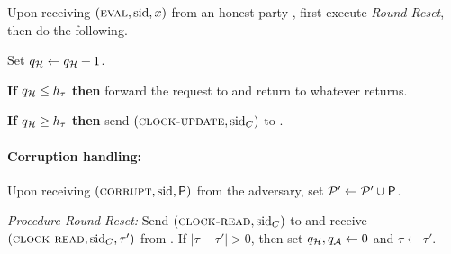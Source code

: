 \begin{cccFunctionality}
\begin{cccItemize}[nosep]
        \item Upon receiving $(\textsc{eval}, \mathrm{sid}, x)$ from an honest party \party, first execute \textit{Round Reset}, then do the following.
        \begin{cccEnum}[nosep]
            \item Set $q_\mathcal{H} \gets q_\mathcal{H} + 1$.
            \item \textbf{If} $q_\mathcal{H} \le h_\tau$ \textbf{then} forward the request to \funcRO and return to \party whatever \funcRO returns.
            \item \textbf{If} $q_\mathcal{H} \ge h_\tau$ \textbf{then} send $(\textsc{clock-update}, \mathrm{sid}_C)$ to \funcClock.
        \end{cccEnum}
    \end{cccItemize}

    \paragraph{Corruption handling:}
    \begin{cccItemize}[nosep]
        \item Upon receiving $(\textsc{corrupt}, \mathrm{sid}, \mathsf{P})$ from the adversary, set $\mathcal{P}' \gets \mathcal{P}' \cup \mathsf{P}$.
    \end{cccItemize}

    \medskip\emph{Procedure Round-Reset:}
    Send $(\textsc{clock-read}, \mathrm{sid}_C)$ to \funcClock and receive $(\textsc{clock-read}, \allowbreak \mathrm{sid}_C, \tau')$ from \funcClock. If $|\tau - \tau' | > 0$, then set $q_\mathcal{H}, q_\mathcal{A} \gets 0$ and $\tau \gets \tau'$.
\end{cccFunctionality}
